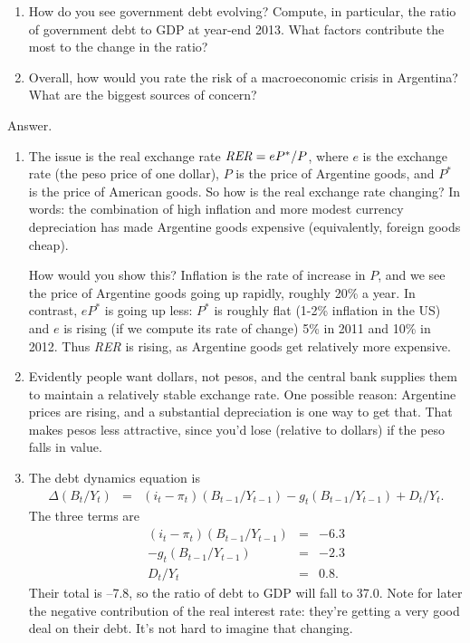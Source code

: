 \begin{enumerate}
\begin{enumerate}
\item How do you see government debt evolving?
Compute, in particular, the ratio of government debt to GDP at year-end 2013.
What factors contribute the most to the change in the ratio?

\item Overall, how would you rate the risk of a macroeconomic crisis in Argentina?
What are the biggest sources of concern?
\end{enumerate}

Answer.
\begin{enumerate}
\item
The issue is the real exchange rate
$ \mbox{\em RER\/} = eP^*/P$, where $e$ is the exchange rate
(the peso price of one dollar),
$P$ is the price of Argentine goods,
and $P^*$ is the price of American goods.
So how is the real exchange rate changing?
In words:  the combination of high inflation and
more modest currency depreciation has made Argentine goods expensive
(equivalently, foreign goods cheap).

How would you show this?
Inflation is the rate of increase in $P$,
and we see the price of Argentine goods going up rapidly, roughly 20\% a year.
In contrast, $eP^*$ is going up less:
$P^*$ is roughly flat (1-2\% inflation in the US)
and $e$ is rising (if we compute its rate of change)
5\% in 2011 and 10\% in 2012.
Thus {\it RER\/} is rising, as Argentine goods get relatively more expensive.

\item Evidently people want dollars, not pesos, and the central bank supplies
them to maintain a relatively stable exchange rate.
One possible reason:  Argentine prices are rising,
and a substantial depreciation is one way to get that.
That makes pesos less attractive, since you'd lose (relative to dollars)
if the peso falls in value.

\item The debt dynamics equation is
\begin{eqnarray*}
   \Delta (B_t/Y_t)  &=&  (i_t - \pi_t)(B_{t-1}/Y_{t-1})
                - g_t (B_{t-1}/Y_{t-1}) + D_t/Y_t .
\end{eqnarray*}
The three terms are
\begin{eqnarray*}
    (i_t - \pi_t)(B_{t-1}/Y_{t-1}) &=&  -6.3  \\
    - g_t (B_{t-1}/Y_{t-1})   &=&  -2.3 \\
    D_t/Y_t  &=&  0.8 .
\end{eqnarray*}
Their total is --7.8, so the ratio of debt to GDP will fall to 37.0.
Note for later the negative contribution of the real interest rate:
they're getting a very good deal on their debt.
It's not hard to imagine that changing.


\end{enumerate}
\end{enumerate}

